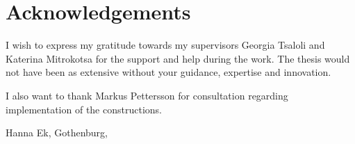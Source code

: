 \thispagestyle{plain}			%
\section*{Acknowledgements}
I wish to express my gratitude towards my supervisors Georgia Tsaloli and  Katerina Mitrokotsa for the support and help during the work. The thesis would not have been as extensive without your guidance, expertise and innovation.

I also want to thank Markus Pettersson for consultation regarding implementation of the constructions. 

\vspace{1.5cm}
\hfill
Hanna Ek, Gothenburg, \monthname \space \the\year

\newpage				%
\thispagestyle{empty}
\mbox{}